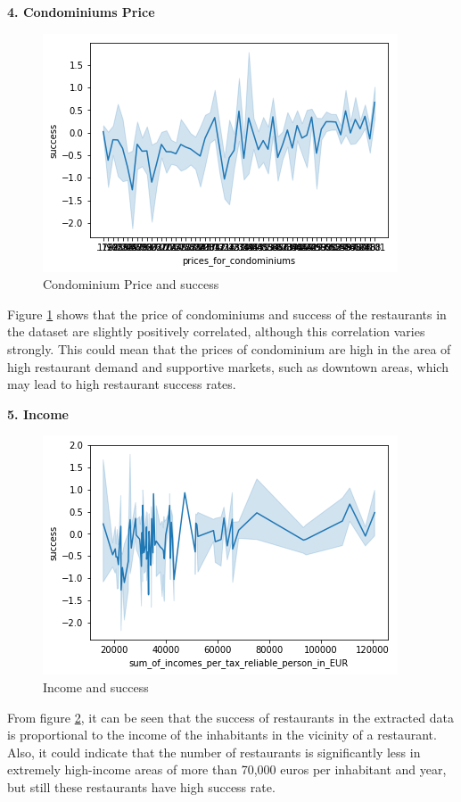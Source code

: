 \documentclass[a4paper, 11pt, oneside]{Thesis}  %
\begin{document}
\textbf{4.	Condominiums Price}
 
\begin{figure}[h]
\includegraphics[scale=0.7]{Figures/Exploratory/lineplot_prices_for_condominiums.png}
\centering
\caption{Condominium Price and success}
\label{fig:lineplot_prices_for_condominiums}
\end{figure}
 
Figure \ref{fig:lineplot_prices_for_condominiums} shows that the price of condominiums and success of the restaurants in the dataset are slightly positively correlated, although this correlation varies strongly. This could mean that the prices of condominium are high in the area of high restaurant demand and supportive markets, such as downtown areas, which may lead to high restaurant success rates.

\textbf{5.	Income}
 
\begin{figure}[h]
\includegraphics[scale=0.7]{Figures/Exploratory/lineplot_income.png}
\centering
\caption{Income and success}
\label{fig:lineplot_income}
\end{figure}

From figure \ref{fig:lineplot_income}, it can be seen that the success of restaurants in the extracted data is proportional to the income of the inhabitants in the vicinity of a restaurant. Also, it could indicate that the number of restaurants is significantly less in extremely high-income areas of more than 70,000 euros per inhabitant and year, but still these restaurants have high success rate.
\end{document}
